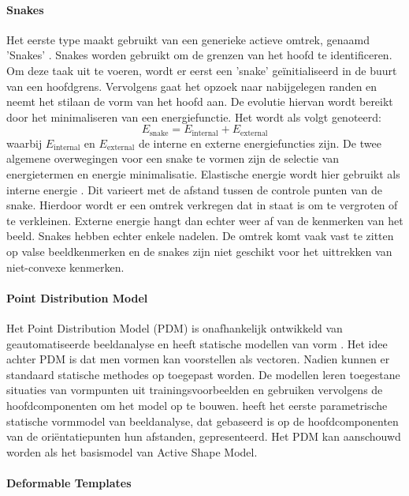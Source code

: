 \paragraph{Snakes}
Het eerste type maakt gebruikt van een generieke actieve omtrek, genaamd 'Snakes' \autocite{Kass1988}.
Snakes worden gebruikt om de grenzen van het hoofd te identificeren. Om deze taak uit te voeren, wordt er eerst een 'snake' geïnitialiseerd in de buurt van een hoofdgrens. Vervolgens gaat het opzoek naar nabijgelegen randen en neemt het stilaan de vorm van het hoofd aan. De evolutie hiervan wordt bereikt door het minimaliseren van een energiefunctie. Het wordt als volgt genoteerd:
\begin{equation*}
    E_{\text{snake}} = E_{\text{internal}} +  E_{\text{external}}
\end{equation*}
waarbij \(E_{\text{internal}} \) en \(E_{\text{external}} \) de interne en externe energiefuncties zijn.
De twee algemene overwegingen voor een snake te vormen zijn de selectie van energietermen en energie minimalisatie.
Elastische energie wordt hier gebruikt als interne energie \autocite{HJELMAS}. Dit varieert met de afstand tussen de controle punten van de snake. Hierdoor wordt er een omtrek verkregen dat in staat is om te vergroten of te verkleinen. Externe energie hangt dan echter weer af van de kenmerken van het beeld. Snakes hebben echter enkele nadelen. De omtrek komt vaak vast te zitten op valse beeldkenmerken en de snakes zijn niet geschikt voor het uittrekken van niet-convexe kenmerken.

\paragraph{Point Distribution Model}
Het Point Distribution Model (PDM) is onafhankelijk ontwikkeld van geautomatiseerde beeldanalyse en heeft statische modellen van vorm \autocite{HJELMAS}. Het idee achter PDM is dat men vormen kan voorstellen als vectoren. Nadien kunnen er standaard statische methodes op toegepast worden. De modellen leren toegestane situaties van vormpunten uit trainingsvoorbeelden en gebruiken vervolgens de hoofdcomponenten om het model op te bouwen. \textcite{Yuille1992} heeft het eerste parametrische statische vormmodel van beeldanalyse, dat gebaseerd is op de hoofdcomponenten van de oriëntatiepunten hun afstanden, gepresenteerd. Het PDM kan aanschouwd worden als het basismodel van Active Shape Model.

\paragraph{Deformable Templates}